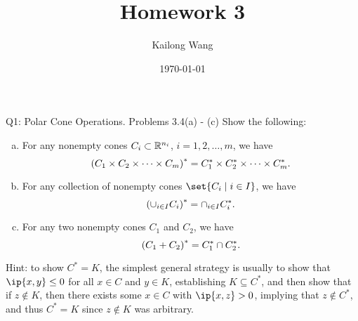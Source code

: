 \documentclass{article}
\title{Homework 3}
\author{Kailong Wang}
\date{\today}
\begin{document}
\maketitle

\begin{problem}
    {Q1: Polar Cone Operations. Problems 3.4(a) - (c)}
    Show the following:
    \begin{enumerate}[(a)]
        \item For any nonempty cones $C_i\subset \R^{n_i}$, $i=1,2,\ldots,m$, we have \[\parens*{C_1 \times C_2 \times \cdots \times C_m}^*=C_1^*\times C_2^* \times \cdots \times C_m^*.\]
        \item For any collection of nonempty cones $\set{C_i\mid i\in I}$, we have \[\parens*{\cup_{i\in I}C_i}^*=\cap_{i\in I}C_i^*.\]
        \item For any two nonempty cones $C_1$ and $C_2$, we have \[\parens*{C_1+C_2}^*=C_1^*\cap C_2^*.\]
    \end{enumerate}
    Hint: to show $C^*=K$, the simplest general strategy is usually to show that $\ip{x,y}\leq 0$ for all $x\in C$ and $y\in K$, establishing $K\subseteq C^*$, and then show that if $z\notin K$, then there exists some $x\in C$ with $\ip{x,z}>0$, implying that $z\notin C^*$, and thus $C^*=K$ since $z\notin K$ was arbitrary.
\end{problem}
\end{document}

